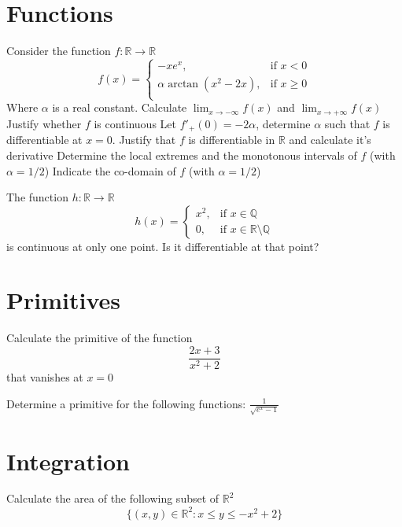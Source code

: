 \documentclass[10pt]{article}
\begin{document}
\section{Functions}
\begin{ExerciseList}
    \Exercise Consider the function $f\colon \mathbb R \to \mathbb R$
    $$f(x) = \begin{cases} -x e^x, & \mbox{if $x<0$} \\ \alpha\arctan(x^2-2x), &\mbox{if $x\ge 0$} \\ \end{cases}$$
    Where $\alpha$ is a real constant.
    \Question Calculate $\lim_{x\to -\infty}f(x)$ and $\lim_{x\to +\infty}f(x)$
    \Question Justify whether $f$ is continuous
    \Question Let $f'_+(0)=-2\alpha$, determine $\alpha$ such that $f$ is differentiable at $x=0$. Justify that $f$ is differentiable in $\mathbb R$ and calculate it's derivative
    \Question Determine the local extremes and the monotonous intervals of $f$ (with $\alpha = 1/2$)
    \Question Indicate the co-domain of $f$ (with $\alpha=1/2$)

    \Exercise The function $h\colon \mathbb R \to \mathbb R$
    $$h(x)=\begin{cases}x^2, & \mbox{if $x\in\mathbb Q$} \\ 0, & \mbox{if $x\in\mathbb R\setminus\mathbb Q$}\end{cases}$$
    is continuous at only one point. Is it differentiable at that point?
\end{ExerciseList}

\section{Primitives}
\begin{ExerciseList}
    \Exercise Calculate the primitive of the function $$\frac{2x+3}{x^2+2}$$ that vanishes at $x=0$

    \Exercise Determine a primitive for the following functions:
    \Question $\frac{1}{\sqrt{e^x - 1}}$
\end{ExerciseList}

\section{Integration}
\begin{ExerciseList}
    \Exercise Calculate the area of the following subset of $\mathbb R^2$
    $$\{(x,y)\in\mathbb R^2 \colon x\le y\le -x^2+2\}$$
\end{ExerciseList}
\end{document}
